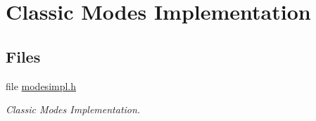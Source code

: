 \hypertarget{group__ClassicModesImpl}{}\section{Classic Modes Implementation}
\label{group__ClassicModesImpl}
\subsection*{Files}
\begin{DoxyCompactItemize}
\item 
file \mbox{\hyperlink{modesimpl_8h}{modesimpl.\+h}}
\begin{DoxyCompactList}\small\item\em Classic Modes Implementation. \end{DoxyCompactList}\end{DoxyCompactItemize}
